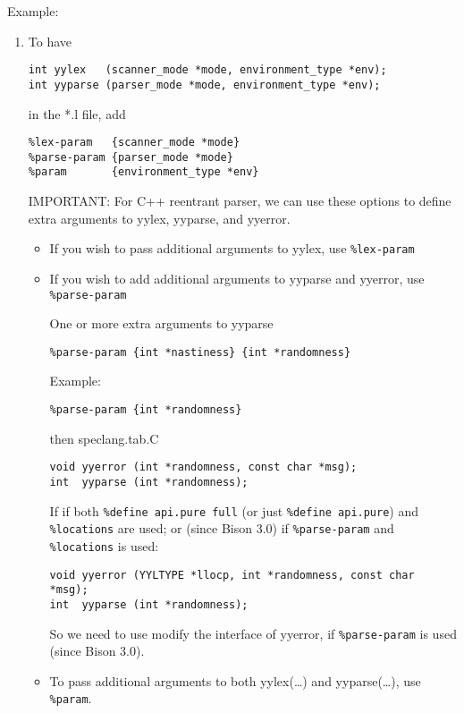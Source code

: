 Example:
\begin{enumerate}
  \item To have
\begin{verbatim}
int yylex   (scanner_mode *mode, environment_type *env);
int yyparse (parser_mode *mode, environment_type *env);
\end{verbatim}

in the *.l file, add
\begin{verbatim}
%lex-param   {scanner_mode *mode}
%parse-param {parser_mode *mode}
%param       {environment_type *env}
\end{verbatim}

IMPORTANT: For C++ reentrant parser, we can use these options to define extra arguments to yylex, yyparse, and yyerror.
\begin{itemize}
  \item If you wish to pass additional arguments to yylex, use \verb!%lex-param! 
  
  \item If you wish to add additional arguments to yyparse and yyerror, use
  \verb!%parse-param!

One or more extra arguments to yyparse
\begin{verbatim}
%parse-param {int *nastiness} {int *randomness}
\end{verbatim}

Example:
\begin{verbatim}
%parse-param {int *randomness}
\end{verbatim}
then speclang.tab.C 
\begin{verbatim}
void yyerror (int *randomness, const char *msg);
int  yyparse (int *randomness);
\end{verbatim}

If if both \verb!%define api.pure full! (or just \verb!%define api.pure!) and \verb!%locations! are used; or (since Bison 3.0) if
\verb!%parse-param! and \verb!%locations! is used:
\begin{verbatim}
void yyerror (YYLTYPE *llocp, int *randomness, const char *msg);
int  yyparse (int *randomness);
\end{verbatim}

So we need to use modify the interface of yyerror, if \verb!%parse-param! is used (since Bison 3.0).

  \item To pass additional arguments to both yylex(\ldots) and yyparse(\ldots), use
  \verb!%param!.
\end{itemize}


\end{enumerate}
